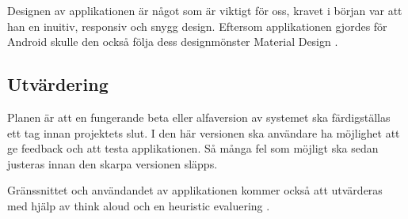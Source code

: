 \documentclass[12pt,a4paper]{article}
\begin{document}
Designen av applikationen är något som är viktigt för oss, kravet i början var att han en inuitiv, responsiv och snygg design. Eftersom applikationen gjordes för Android skulle den också följa dess designmönster Material Design \cite{MaterialDesign}.

\subsection{Utvärdering}
Planen är att en fungerande beta eller alfaversion av systemet ska färdigställas ett tag innan projektets slut. I den här versionen ska användare ha möjlighet att ge feedback och att testa applikationen. Så många fel som möjligt ska sedan justeras innan den skarpa versionen släpps.

Gränssnittet och användandet av applikationen kommer också att utvärderas med hjälp av think aloud\cite{thinkaloud} och en heuristic evaluering \cite{heruistic}.

\newpage
\printbibliography[title={Referenser}]
\end{document}
